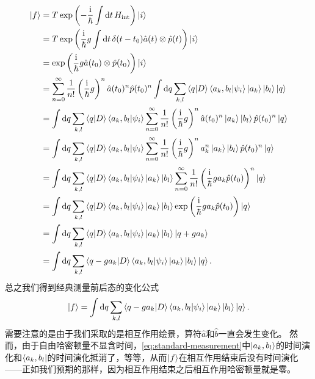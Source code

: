\documentclass[UTF8, a4paper]{ctexart}
\newcommand*{\ii}{\mathrm{i}}
\begin{document}
\[
    \begin{aligned}
        \ket{f} &= T \exp \left( - \frac{\ii}{\hbar} \int \dd{t} H_\text{int} \right) \ket{i} \\
        &= T \exp \left( \frac{\ii}{\hbar} g \int \dd{t} \delta(t-t_0) \hat{a}(t) \otimes \hat{p}(t) \right) \ket{i} \\
        &= \exp \left( \frac{\ii}{\hbar} g \hat{a}(t_0) \otimes \hat{p}(t_0) \right) \ket{i} \\
        &= \sum_{n=0}^\infty \frac{1}{n!} \left(\frac{\ii}{\hbar} g\right)^n \hat{a}(t_0)^n \hat{p}(t_0)^n \int \dd{q} \sum_{k, l} \braket{q}{D} \braket{a_k, b_l}{\psi_i} \ket{a_k} \ket{b_l} \ket{q} \\
        &= \int \dd{q} \sum_{k, l} \braket{q}{D} \braket{a_k, b_l}{\psi_i} \sum_{n=0}^\infty \frac{1}{n!} \left(\frac{\ii}{\hbar} g\right)^n \hat{a}(t_0)^n \ket{a_k} \ket{b_l} \hat{p}(t_0)^n \ket{q} \\
        &= \int \dd{q} \sum_{k, l} \braket{q}{D} \braket{a_k, b_l}{\psi_i} \sum_{n=0}^\infty \frac{1}{n!} \left(\frac{\ii}{\hbar} g\right)^n a_k^n \ket{a_k} \ket{b_l} \hat{p}(t_0)^n \ket{q} \\
        &= \int \dd{q} \sum_{k, l} \braket{q}{D} \braket{a_k, b_l}{\psi_i} \ket{a_k} \ket{b_l} \sum_{n=0}^\infty \frac{1}{n!} \left(\frac{\ii}{\hbar} g a_k \hat{p}(t_0) \right)^n \ket{q} \\
        &= \int \dd{q} \sum_{k, l} \braket{q}{D} \braket{a_k, b_l}{\psi_i} \ket{a_k} \ket{b_l} \exp \left( \frac{\ii}{\hbar} g a_k \hat{p}(t_0) \right) \ket{q} \\
        &= \int \dd{q} \sum_{k, l} \braket{q}{D} \braket{a_k, b_l}{\psi_i} \ket{a_k} \ket{b_l} \ket{q + g a_k} \\
        &= \int \dd{q} \sum_{k, l} \braket{q - g a_k}{D} \braket{a_k, b_l}{\psi_i} \ket{a_k} \ket{b_l} \ket{q} .
    \end{aligned}
\]
总之我们得到经典测量前后态的变化公式
\begin{equation}
    \ket{f} = \int \dd{q} \sum_{k, l} \braket{q - g a_k}{D} \braket{a_k, b_l}{\psi_i} \ket{a_k} \ket{b_l} \ket{q}.
    \label{eq:standard-measurement}
\end{equation}
需要注意的是由于我们采取的是相互作用绘景，算符$\hat{a}$和$\hat{b}$一直会发生变化。
然而，由于自由哈密顿量不显含时间，\eqref{eq:standard-measurement}中$\ket{a_k, b_l}$的时间演化和$\bra{a_k, b_l}$的时间演化抵消了，等等，从而$\ket{f}$在相互作用结束后没有时间演化——正如我们预期的那样，因为相互作用结束之后相互作用哈密顿量就是零。
\end{document}
